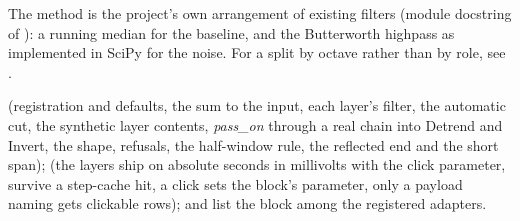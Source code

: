 The method is the project's own arrangement of existing filters (module docstring of
): a running median for the baseline, and the
Butterworth highpass \citep{butterworth1930theory} as implemented in SciPy
\citep{virtanen2020scipy} for the noise. For a split by octave rather than by role, see
.

 (registration and defaults, the sum to the input, each
layer's filter, the automatic cut, the synthetic layer contents, \emph{pass\_on} through a real
chain into Detrend and Invert, the  shape, refusals, the half-window rule, the
reflected end and the short span);  (the layers ship
on absolute seconds in millivolts with the click parameter, survive a step-cache hit, a click
sets the block's parameter, only a payload naming  gets clickable rows);
 and  list the block among the
registered adapters.
